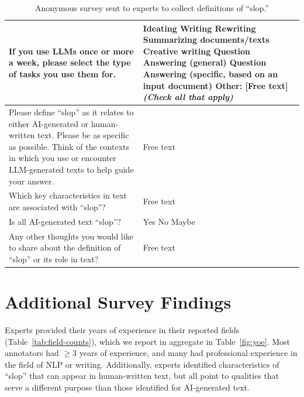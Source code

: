 \documentclass{article} %
\begin{document}
\begin{table}[h]
\begin{longtable}{p{} p{}}
If you use LLMs once or more a week, please select the type of tasks you use them for. & Ideating \newline Writing \newline Rewriting \newline Summarizing documents/texts \newline Creative writing \newline Question Answering (general) \newline Question Answering (specific, based on an input document) \newline Other: [Free text] \newline \textit{(Check all that apply)} \\
\midrule

Please define ``slop'' as it relates to either AI-generated or human-written text. Please be as specific as possible. Think of the contexts in which you use or encounter LLM-generated texts to help guide your answer. & Free text \\
\midrule

Which key characteristics in text are associated with ``slop''? & Free text \\
\midrule

Is all AI-generated text ``slop''? & Yes \newline No \newline Maybe \\
\midrule

Any other thoughts you would like to share about the definition of ``slop'' or its role in text? & Free text \\ 
\bottomrule
\end{longtable}
\caption{Anonymous survey sent to experts to collect definitions of ``slop.''}
\label{app:survey-questions}
\end{table}


\section{Additional Survey Findings}
\label{app:survey-findings}
Experts provided their years of experience in their reported fields (Table~\ref{tab:field-counts}), which we report in aggregate in Table~\ref{fig:yoe}. 
Most annotators had $\geq$3 years of experience, and many had professional experience in the field of NLP or writing. 
Additionally, experts identified characteristics of ``slop'' that can appear in human-written text, but all point to qualities that serve a different purpose than those identified for AI-generated text. 
\end{document}
